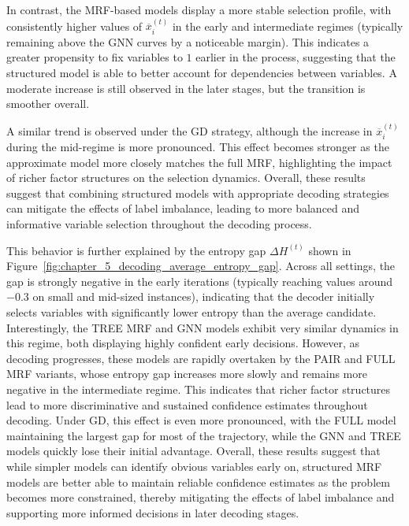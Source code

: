 In contrast, the MRF-based models display a more stable selection profile, with consistently higher values of $\overline{x}_i^{(t)}$ in the early and intermediate regimes (typically remaining above the GNN curves by a noticeable margin). This indicates a greater propensity to fix variables to $1$ earlier in the process, suggesting that the structured model is able to better account for dependencies between variables. A moderate increase is still observed in the later stages, but the transition is smoother overall.

A similar trend is observed under the GD strategy, although the increase in $\overline{x}_i^{(t)}$ during the mid-regime is more pronounced. This effect becomes stronger as the approximate model more closely matches the full MRF, highlighting the impact of richer factor structures on the selection dynamics. Overall, these results suggest that combining structured models with appropriate decoding strategies can mitigate the effects of label imbalance, leading to more balanced and informative variable selection throughout the decoding process.

This behavior is further explained by the entropy gap $\Delta H^{(t)}$ shown in Figure~\ref{fig:chapter_5_decoding_average_entropy_gap}. Across all settings, the gap is strongly negative in the early iterations (typically reaching values around $-0.3$ on small and mid-sized instances), indicating that the decoder initially selects variables with significantly lower entropy than the average candidate. Interestingly, the TREE MRF and GNN models exhibit very similar dynamics in this regime, both displaying highly confident early decisions. However, as decoding progresses, these models are rapidly overtaken by the PAIR and FULL MRF variants, whose entropy gap increases more slowly and remains more negative in the intermediate regime. This indicates that richer factor structures lead to more discriminative and sustained confidence estimates throughout decoding. Under GD, this effect is even more pronounced, with the FULL model maintaining the largest gap for most of the trajectory, while the GNN and TREE models quickly lose their initial advantage. Overall, these results suggest that while simpler models can identify obvious variables early on, structured MRF models are better able to maintain reliable confidence estimates as the problem becomes more constrained, thereby mitigating the effects of label imbalance and supporting more informed decisions in later decoding stages.



